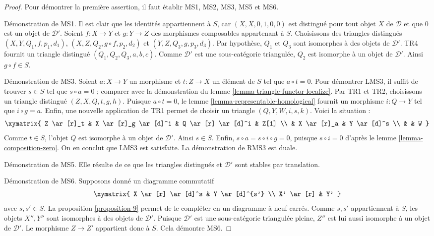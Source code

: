 \begin{proof}
Pour démontrer la première assertion, il faut établir MS1, MS2, MS3, MS5 et
MS6.

\medskip\noindent
Démonstration de MS1. Il est clair que les identités appartiennent à $S$, car
$(X, X, 0, 1, 0, 0)$ est distingué pour tout objet $X$ de $\mathcal{D}$ et que
$0$ est un objet de $\mathcal{D}'$. Soient $f : X \to Y$ et $g : Y \to Z$ des
morphismes composables appartenant à $S$. Choisissons des triangles distingués
$(X, Y, Q_1, f, p_1, d_1)$,
$(X, Z, Q_2, g \circ f, p_2, d_2)$ et $(Y, Z, Q_3, g, p_3, d_3)$.
Par hypothèse, $Q_1$ et $Q_3$ sont isomorphes à des objets de $\mathcal{D}'$.
TR4 fournit un triangle distingué $(Q_1, Q_2, Q_3, a, b, c)$. Comme
$\mathcal{D}'$ est une sous-catégorie triangulée, $Q_2$ est isomorphe à un
objet de $\mathcal{D}'$. Ainsi $g \circ f \in S$.

\medskip\noindent
Démonstration de MS3. Soient $a : X \to Y$ un morphisme et $t : Z \to X$ un
élément de $S$ tel que $a \circ t = 0$. Pour démontrer LMS3, il suffit de
trouver $s \in S$ tel que $s \circ a = 0$ ; comparer avec la démonstration du
lemme \ref{lemma-triangle-functor-localize}. Par TR1 et TR2, choisissons un
triangle distingué $(Z, X, Q, t, g, h)$. Puisque $a \circ t = 0$, le
lemme \ref{lemma-representable-homological} fournit un morphisme
$i : Q \to Y$ tel que $i \circ g = a$. Enfin, une nouvelle application de TR1
permet de choisir un triangle $(Q, Y, W, i, s, k)$. Voici la situation :
$$
\xymatrix{
Z \ar[r]_t & X \ar[r]_g \ar[d]^1 & Q \ar[r] \ar[d]^i & Z[1] \\
& X \ar[r]_a & Y \ar[d]^s \\
& & W
}
$$
Comme $t \in S$, l'objet $Q$ est isomorphe à un objet de $\mathcal{D}'$.
Ainsi $s \in S$. Enfin, $s \circ a = s \circ i \circ g = 0$, puisque
$s \circ i = 0$ d'après le lemme \ref{lemma-composition-zero}.
On en conclut que LMS3 est satisfaite.
La démonstration de RMS3 est duale.

\medskip\noindent
Démonstration de MS5. Elle résulte de ce que les triangles distingués et
$\mathcal{D}'$ sont stables par translation.

\medskip\noindent
Démonstration de MS6. Supposons donné un diagramme commutatif
$$
\xymatrix{
X \ar[r] \ar[d]^s &
Y \ar[d]^{s'} \\
X' \ar[r] &
Y'
}
$$
avec $s, s' \in S$. La proposition \ref{proposition-9} permet de le compléter
en un diagramme à neuf carrés. Comme $s, s'$ appartiennent à $S$, les objets
$X'', Y''$ sont isomorphes à des objets de $\mathcal{D}'$. Puisque
$\mathcal{D}'$ est une sous-catégorie triangulée pleine, $Z''$ est lui aussi
isomorphe à un objet de $\mathcal{D}'$. Le morphisme $Z \to Z'$ appartient
donc à $S$. Cela démontre MS6.


\end{proof}
